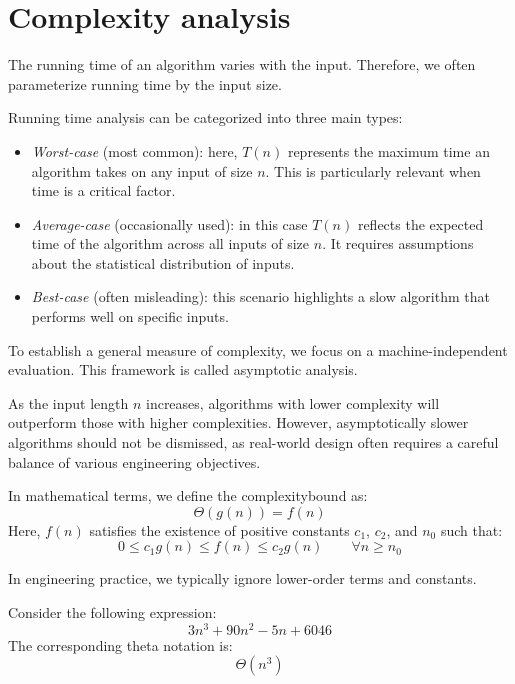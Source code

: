 \section{Complexity analysis}

The running time of an algorithm varies with the input. 
Therefore, we often parameterize running time by the input size.

Running time analysis can be categorized into three main types:
\begin{itemize}
    \item \textit{Worst-case} (most common): here, $T(n)$ represents the maximum time an algorithm takes on any input of size $n$. 
    This is particularly relevant when time is a critical factor.
    \item \textit{Average-case} (occasionally used): in this case $T(n)$ reflects the expected time of the algorithm across all inputs of size $n$. 
    It requires assumptions about the statistical distribution of inputs.
    \item \textit{Best-case} (often misleading): this scenario highlights a slow algorithm that performs well on specific inputs.
\end{itemize}
To establish a general measure of complexity, we focus on a machine-independent evaluation.
This framework is called asymptotic analysis. 

As the input length $n$ increases, algorithms with lower complexity will outperform those with higher complexities. 
However, asymptotically slower algorithms should not be dismissed, as real-world design often requires a careful balance of various engineering objectives. 

In mathematical terms, we define the complexitybound as:
\[\Theta\left(g(n)\right)=f(n)\]
Here, $f(n)$ satisfies the existence of positive constants $c_1$, $c_2$, and $n_0$ such that:
\[0 \leq c_1 g(n) \leq f (n) \leq c_2  g(n) \qquad\forall n \geq n_0\]

In engineering practice, we typically ignore lower-order terms and constants.
\begin{example}
    Consider the following expression: 
    \[3n^3+90n^2-5n+6046\]
    The corresponding theta notation is:
    \[\Theta(n^3)\]
\end{example}

